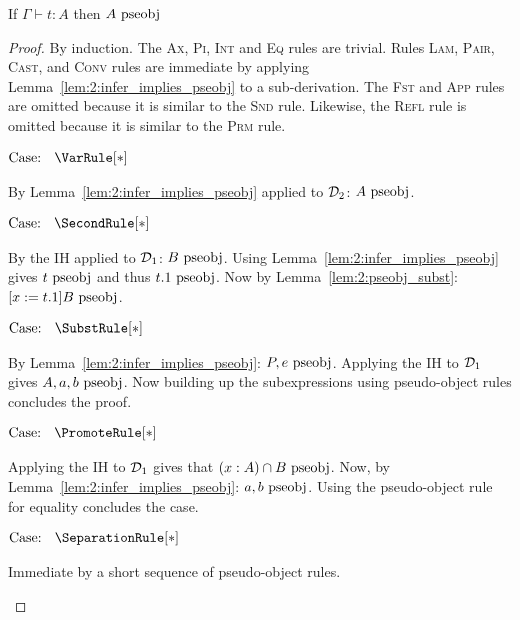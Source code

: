 \begin{lemma}
    If $\Gamma \vdash t : A$ then $A~\textnormal{pseobj}$
    \label{lem:2:infer_implies_pseobj_type}
\end{lemma}
\begin{proof}
    By induction.
    The \textsc{Ax}, \textsc{Pi}, \textsc{Int} and \textsc{Eq} rules are trivial.
    Rules \textsc{Lam}, \textsc{Pair}, \textsc{Cast}, and \textsc{Conv} rules are immediate by applying Lemma~\ref{lem:2:infer_implies_pseobj} to a sub-derivation.
    The \textsc{Fst} and \textsc{App} rules are omitted because it is similar to the \textsc{Snd} rule.
    Likewise, the \textsc{Refl} rule is omitted because it is similar to the \textsc{Prm} rule.

    $\text{Case: }\begin{array}{c} \VarRule[*] \end{array}$
    \begin{proofcase}
        By Lemma~\ref{lem:2:infer_implies_pseobj} applied to $\mathcal{D}_{2}$: $A~\textnormal{pseobj}$.
    \end{proofcase}

    $\text{Case: }\begin{array}{c} \SecondRule[*] \end{array}$
    \begin{proofcase}
        By the IH applied to $\mathcal{D}_{1}$: $B~\textnormal{pseobj}$.
        Using Lemma~\ref{lem:2:infer_implies_pseobj} gives $t~\textnormal{pseobj}$ and thus $t.1~\textnormal{pseobj}$.
        Now by Lemma~\ref{lem:2:pseobj_subst}: $[x := t.1]B~\textnormal{pseobj}$.
    \end{proofcase}

    $\text{Case: }\begin{array}{c} \SubstRule[*] \end{array}$
    \begin{proofcase}
        By Lemma~\ref{lem:2:infer_implies_pseobj}: $P, e~\textnormal{pseobj}$.
        Applying the IH to $\mathcal{D}_{1}$ gives $A, a, b~\textnormal{pseobj}$.
        Now building up the subexpressions using pseudo-object rules concludes the proof.
    \end{proofcase}

    $\text{Case: }\begin{array}{c} \PromoteRule[*] \end{array}$
    \begin{proofcase}
        Applying the IH to $\mathcal{D}_{1}$ gives that $(x : A) \cap B~\textnormal{pseobj}$.
        Now, by Lemma~\ref{lem:2:infer_implies_pseobj}: $a, b~\textnormal{pseobj}$.
        Using the pseudo-object rule for equality concludes the case.
    \end{proofcase}

    $\text{Case: }\begin{array}{c} \SeparationRule[*] \end{array}$
    \begin{proofcase}
        Immediate by a short sequence of pseudo-object rules.
    \end{proofcase}
\end{proof}


